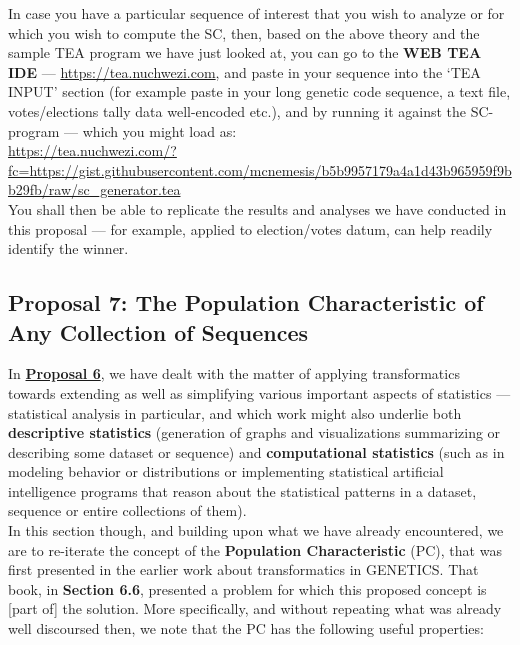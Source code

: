 \documentclass[a4paper, 18pt]{book} %
\begin{document}
  \vspace{2em}

In case you have a particular sequence of interest that you wish to analyze or for which you wish to compute the SC, then, based on the above theory and the sample TEA program we have just looked at, you can go to the \textbf{WEB TEA IDE} --- \url{https://tea.nuchwezi.com}, and paste in your sequence into the `TEA INPUT' section (for example paste in your long genetic code sequence, a text file, votes/elections tally data well-encoded etc.), and by running it against the SC-program --- which you might load as:\\

\url{https://tea.nuchwezi.com/?fc=https://gist.githubusercontent.com/mcnemesis/b5b9957179a4a1d43b965959f9bb29fb/raw/sc_generator.tea}\\


You shall then be able to replicate the results and analyses we have conducted in this proposal --- for example, applied to election/votes datum, can help readily identify the winner.


\subsection{Proposal 7: The Population Characteristic of Any Collection of Sequences\cite{lutalo_2025_trans_genetics}}
\label{PROP7}


In \textbf{\hyperref[PROP6]{Proposal 6}}, we have dealt with the matter of applying transformatics towards extending as well as simplifying various important aspects of statistics --- statistical analysis in particular, and which work might also underlie both \textbf{descriptive statistics} (generation of graphs and visualizations summarizing or describing some dataset or sequence) and \textbf{computational statistics} (such as in modeling behavior or distributions or implementing statistical artificial intelligence programs that reason about the statistical patterns in a dataset, sequence or entire collections of them).\\


In this section though, and building upon what we have already encountered, we are to re-iterate the concept of the \textbf{Population Characteristic} (PC), that was first presented in the earlier work about transformatics in GENETICS\cite{lutalo_2025_trans_genetics}. That book, in 	\textbf{Section 6.6}, presented a problem for which this proposed concept is [part of] the solution. More specifically, and without repeating what was already well discoursed then, we note that the PC has the following useful properties:
\end{document}
